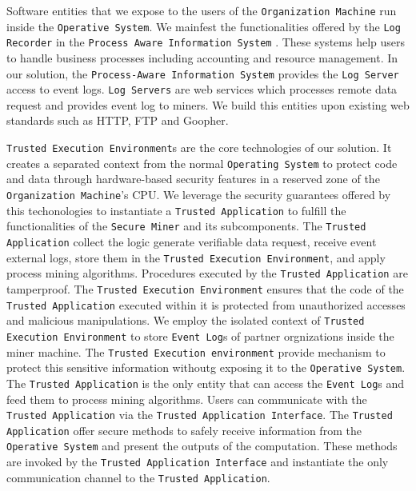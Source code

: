 Software entities that we expose to the users of the \texttt{Organization Machine} run inside the \texttt{Operative System}. We mainfest the functionalities offered by the \texttt{Log Recorder} in the \texttt{Process Aware Information System}  \cite{Dumas.etal/2018:FundamentalsofBPM}. These systems help users to handle business processes including accounting and resource management. In our solution, the \texttt{Process-Aware Information System} provides the \texttt{Log Server} access to event logs. \texttt{Log Servers} are web services which processes remote data request and provides event log to miners. We build this entities upon existing web standards such as HTTP, FTP and Goopher.

\texttt{Trusted Execution Environment}s are the core technologies of our solution. It creates a separated context from the normal \texttt{Operating System} to protect code and data through hardware-based security features in a reserved zone of the \texttt{Organization Machine}'s CPU. We leverage the security guarantees offered by this techonologies to instantiate a \texttt{Trusted Application} to fulfill the functionalities of the \texttt{Secure Miner} and its subcomponents. The \texttt{Trusted Application} collect the logic generate verifiable data request, receive event external logs, store them in the \texttt{Trusted Execution Environment}, and apply process mining algorithms. Procedures executed by the \texttt{Trusted Application} are tamperproof. The \texttt{Trusted Execution Environment} ensures that the code of the \texttt{Trusted Application} executed within it is protected from unauthorized accesses and malicious manipulations. We employ the isolated context of \texttt{Trusted Execution Environment} to store \texttt{Event Log}s of partner orgnizations inside the miner machine. The \texttt{Trusted Execution environment} provide mechanism to protect this sensitive information withoutg exposing it to the \texttt{Operative System}. The \texttt{Trusted Application} is the only entity that can access the \texttt{Event Log}s and feed them to process mining algorithms. Users can communicate with the \texttt{Trusted Application} via the \texttt{Trusted Application Interface}. The \texttt{Trusted Application} offer secure methods to safely receive information from  the \texttt{Operative System} and present the outputs of the computation. These methods are invoked by the \texttt{Trusted Application Interface} and instantiate the only communication channel to the \texttt{Trusted Application}.
%


